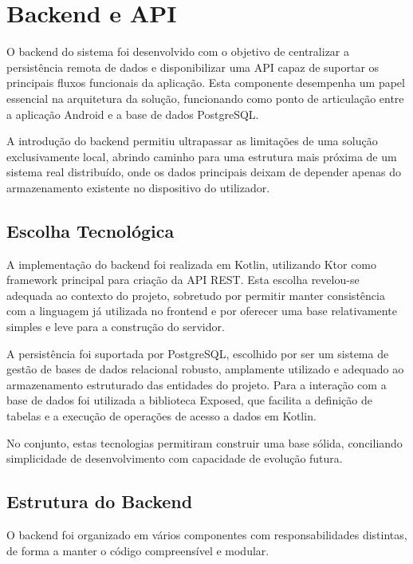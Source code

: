 %
%
\chapter{Backend e API} \label{cap:backend}

O backend do sistema foi desenvolvido com o objetivo de centralizar a persistência remota de dados e disponibilizar uma API
capaz de suportar os principais fluxos funcionais da aplicação.
Esta componente desempenha um papel essencial na arquitetura da solução, funcionando como ponto de articulação entre a
aplicação Android e a base de dados PostgreSQL.

A introdução do backend permitiu ultrapassar as limitações de uma solução exclusivamente local, abrindo caminho para
uma estrutura mais próxima de um sistema real distribuído, onde os dados principais deixam de depender apenas do armazenamento
existente no dispositivo do utilizador.

\section{Escolha Tecnológica}

A implementação do backend foi realizada em Kotlin, utilizando Ktor como framework principal para criação da API REST.
Esta escolha revelou-se adequada ao contexto do projeto, sobretudo por permitir manter consistência com a linguagem
já utilizada no frontend e por oferecer uma base relativamente simples e leve para a construção do servidor.

A persistência foi suportada por PostgreSQL, escolhido por ser um sistema de gestão de bases de dados relacional robusto,
amplamente utilizado e adequado ao armazenamento estruturado das entidades do projeto.
Para a interação com a base de dados foi utilizada a biblioteca Exposed, que facilita a definição de tabelas e a execução
de operações de acesso a dados em Kotlin.

No conjunto, estas tecnologias permitiram construir uma base sólida, conciliando simplicidade de desenvolvimento
com capacidade de evolução futura.

\section{Estrutura do Backend}

O backend foi organizado em vários componentes com responsabilidades distintas, de forma a manter o código compreensível e modular.

